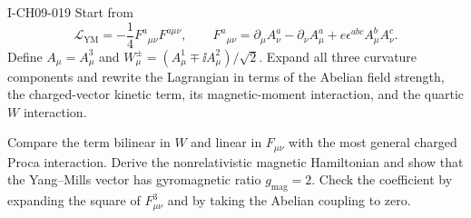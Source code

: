 \begin{exercise}[$SU(2)$ gauge bosons as charged vectors with $g=2$]{I-CH09-019}
Start from
\[
  \mathcal L_{\mathrm{YM}}=-\frac14F^a{}_{\mu\nu}F^{a\mu\nu},
  \qquad
  F^a{}_{\mu\nu}=\partial_\mu A^a_\nu-\partial_\nu A^a_\mu
  +e\epsilon^{abc}A^b_\mu A^c_\nu.
\]
Define $A_\mu=A^3_\mu$ and
$W^\pm_\mu=(A^1_\mu\mp\ii A^2_\mu)/\sqrt2$.  Expand all three curvature
components and rewrite the Lagrangian in terms of the Abelian field strength,
the charged-vector kinetic term, its magnetic-moment interaction, and the
quartic $W$ interaction.

Compare the term bilinear in $W$ and linear in $F_{\mu\nu}$ with the most
general charged Proca interaction.  Derive the nonrelativistic magnetic
Hamiltonian and show that the Yang--Mills vector has gyromagnetic ratio
$g_{\mathrm{mag}}=2$.  Check the coefficient by expanding the square of
$F^3_{\mu\nu}$ and by taking the Abelian coupling to zero.
\end{exercise}
